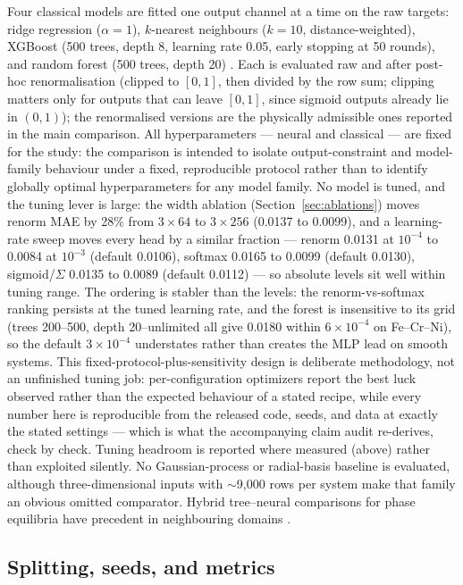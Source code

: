 \documentclass[preprint,12pt,authoryear]{elsarticle}
\begin{document}
Four classical models are fitted one output channel at a time on the raw
targets: ridge regression ($\alpha = 1$), $k$-nearest neighbours ($k = 10$,
distance-weighted), XGBoost \citep{chen2016xgboost} (500 trees, depth 8,
learning rate 0.05, early stopping at 50 rounds), and random forest (500
trees, depth 20) \citep{breiman2001random}. Each is evaluated raw and after
post-hoc renormalisation (clipped to $[0,1]$, then divided by the row sum;
clipping matters only for outputs that can leave $[0,1]$, since sigmoid
outputs already lie in $(0,1)$); the renormalised versions are the physically
admissible ones reported in the main comparison. All hyperparameters ---
neural and classical --- are fixed for the study: the comparison is intended
to isolate output-constraint and model-family behaviour under a fixed,
reproducible protocol rather than to identify globally optimal
hyperparameters for any model family. No model is tuned, and the tuning
lever is large: the width ablation (Section~\ref{sec:ablations}) moves
renorm MAE by 28\% from $3\times64$ to $3\times256$ (0.0137 to 0.0099),
and a learning-rate sweep moves every head by a similar fraction ---
renorm 0.0131 at $10^{-4}$ to 0.0084 at $10^{-3}$ (default 0.0106),
softmax 0.0165 to 0.0099 (default 0.0130), sigmoid/$\Sigma$ 0.0135 to
0.0089 (default 0.0112) --- so absolute levels sit
well within tuning range. The ordering is stabler than the levels: the
renorm-vs-softmax ranking persists at the tuned learning rate, and the
forest is insensitive to its grid (trees 200--500, depth 20--unlimited
all give 0.0180 within $6\times10^{-4}$ on Fe--Cr--Ni), so the default
$3\times10^{-4}$ understates rather than creates the MLP lead on smooth
systems. This fixed-protocol-plus-sensitivity design is deliberate
methodology, not an unfinished tuning job: per-configuration optimizers
report the best luck observed rather than the expected behaviour of a
stated recipe, while every number here is reproducible from the released
code, seeds, and data at exactly the stated settings --- which is what
the accompanying claim audit re-derives, check by check. Tuning headroom is reported
where measured (above) rather than exploited silently. No
Gaussian-process or radial-basis baseline is evaluated, although
three-dimensional inputs with $\sim$9{,}000 rows per system make that
family an obvious omitted comparator. Hybrid tree--neural comparisons for
phase equilibria have precedent in neighbouring domains
\citep{song2019clathrate}.

\subsection{Splitting, seeds, and metrics}
\end{document}
